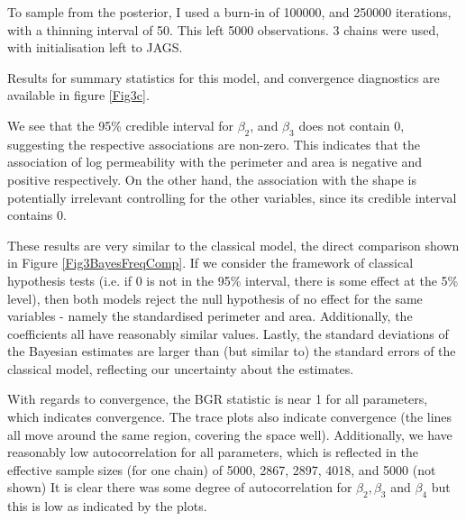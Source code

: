 \documentclass{article}
\begin{document}
To sample from the posterior, I used a burn-in of 100000, and 250000 iterations, with a thinning interval of 50. This left 5000 observations. 3 chains were used, with initialisation left to JAGS. 

Results for summary statistics for this model, and convergence diagnostics are available in figure \ref{Fig3c}. 

We see that the 95\% credible interval for $\beta_2$, and $\beta_3$ does not contain 0, suggesting the respective associations are non-zero. This indicates that the association of log permeability with the perimeter and area is negative and positive respectively. On the other hand, the association with the shape is potentially irrelevant controlling for the other variables, since its credible interval contains 0. 

These results are very similar to the classical model, the direct comparison shown in Figure \ref{Fig3BayesFreqComp}. If we consider the framework of classical hypothesis tests (i.e. if 0 is not in the 95\% interval, there is some effect at the 5\% level), then both models reject the null hypothesis of no effect for the same variables - namely the standardised perimeter and area. Additionally, the coefficients all have reasonably similar values. Lastly, the standard deviations of the Bayesian estimates are larger than (but similar to) the standard errors of the classical model, reflecting our uncertainty about the estimates. 


With regards to convergence, the BGR statistic is near 1 for all parameters, which indicates convergence. The trace plots also indicate convergence (the lines all move around the same region, covering the space well). Additionally, we have reasonably low autocorrelation for all parameters, which is reflected in the effective sample sizes (for one chain) of 5000, 2867, 2897, 4018, and 5000 (not shown) It is clear there was some degree of autocorrelation for $\beta_2, \beta_3$ and $\beta_4$ but this is low as indicated by the plots. 
\end{document}
